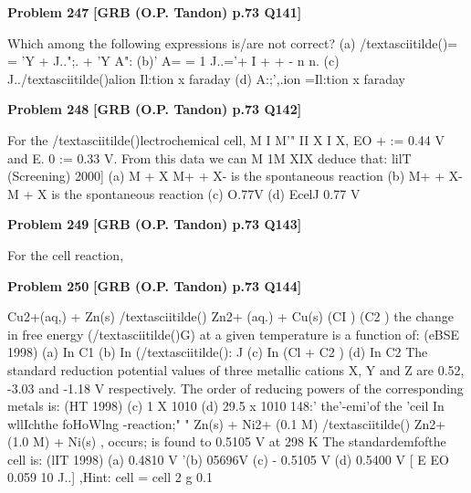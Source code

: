 \begin{problembox}
\textbf{Problem 247} \hfill \textbf{[GRB (O.P. Tandon) p.73 Q141]}
\label{q:ext-grb_all_questions-247}

Which among the following expressions is/are not correct? 
(a) /textasciitilde()= = 'Y + J..";. + 'Y \underline{\hspace{1cm}} A": 
(b)' A= = \underline{\hspace{1cm}}1 J..='+ I 
+ 
+ 
-
n 
n. 
(c) J../textasciitilde()alion 
Il:tion x faraday 
(d) A:;',.ion =Il:tion x faraday
\end{problembox}

\begin{problembox}
\textbf{Problem 248} \hfill \textbf{[GRB (O.P. Tandon) p.73 Q142]}
\label{q:ext-grb_all_questions-248}

For 
the 
/textasciitilde()lectrochemical 
cell, 
M I M'" II X I X, 
EO + 
:= 0.44 V and E.
0 
\underline{\hspace{1cm}}:= 0.33 V. From this data we can 
M 1M 
XIX 
deduce that: 
lilT (Screening) 2000] 
(a) M + X 
M+ + X- is the spontaneous reaction 
(b) M+ + X-
M + X is the spontaneous reaction 
(c) 
O.77V 
(d) EcelJ 
0.77 V
\end{problembox}

\begin{problembox}
\textbf{Problem 249} \hfill \textbf{[GRB (O.P. Tandon) p.73 Q143]}
\label{q:ext-grb_all_questions-249}

For the cell reaction,
\end{problembox}

\begin{problembox}
\textbf{Problem 250} \hfill \textbf{[GRB (O.P. Tandon) p.73 Q144]}
\label{q:ext-grb_all_questions-250}

Cu2+(aq,) + Zn(s) /textasciitilde() 
Zn2+ (aq.) + Cu(s) 
(CI ) 
(C2 ) 
the change in free energy (/textasciitilde()G) at a given temperature is a 
function of: 
(eBSE 1998) 
(a) In C1 
(b) In (/textasciitilde(): J 
(c) In (Cl + C2 ) 
(d) In C2 
The standard reduction potential values of three metallic 
cations X, Y and Z are 0.52, -3.03 and -1.18 V respectively. 
The order of reducing powers of the corresponding metals is: 
(HT 1998) 
(c) 1 X 1010 
(d) 29.5 x 1010 
148:' the'-emi'of the 'ceil In wllIchthe foHoWlng -reaction;" " 
Zn(s) + Ni2+ (0.1 M) /textasciitilde() 
Zn2+ (1.0 M) + Ni(s) 
, 
occurs; is found to 0.5105 V at 298 K The standardemfofthe 
cell is: 
(lIT 1998) 
(a) 0.4810 V 
'(b) 05696V 
(c) - 0.5105 V 
(d) 0.5400 V 
[ 
E 
EO 
0.059 10 J..] 
,Hint: 
cell = 
cell 
2 
g 0.1
\end{problembox}

